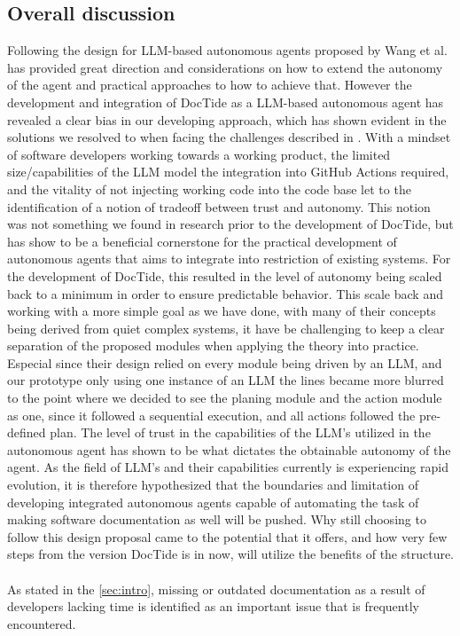 \subsection{Overall discussion}
Following the design for LLM-based autonomous agents proposed by Wang et al.\cite{wang2024survey} has provided great direction and considerations on how to extend the autonomy of the agent and practical approaches to how to achieve that. However the development and integration of DocTide as a LLM-based autonomous agent has revealed a clear bias in our developing approach, which has shown evident in the solutions we resolved to when facing the challenges described in . With a mindset of software developers working towards a working product, the limited size/capabilities of the LLM model the integration into GitHub Actions required, and the vitality of not injecting working code into the code base let to the identification of a notion of tradeoff between trust and autonomy. This notion was not something we found in research prior to the development of DocTide, but has show to be a beneficial cornerstone for the practical development of autonomous agents that aims to integrate into restriction of existing systems. For the development of DocTide, this resulted in the level of autonomy being scaled back to a minimum in order to ensure predictable behavior. This scale back and working with a more simple goal as we have done, with many of their concepts being derived from quiet complex systems, it have be challenging to keep a clear separation of the proposed modules when applying the theory into practice. Especial since their design relied on every module being driven by an LLM, and our prototype only using one instance of an LLM the lines became more blurred to the point where we decided to see the planing module and the action module as one, since it followed a sequential execution, and all actions followed the pre-defined plan. The level of trust in the capabilities of the LLM's utilized in the autonomous agent has shown to be what dictates the obtainable autonomy of the agent. As the field of LLM's and their capabilities currently is experiencing rapid evolution, it is therefore hypothesized that the boundaries and limitation of developing integrated autonomous agents capable of automating the task of making software documentation as well will be pushed. Why still choosing to follow this design proposal came to the potential that it offers, and how very few steps from the version DocTide is in now, will utilize the benefits of the structure.
\\\\
As stated in the \cref{sec:intro}, missing or outdated documentation as a result of developers lacking time is identified as an important issue that is frequently encountered. 

